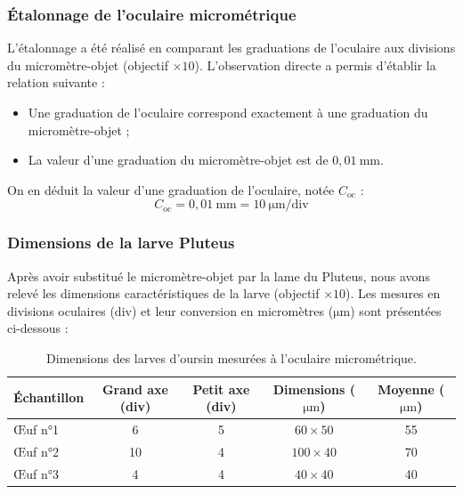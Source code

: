 \subsubsection{Étalonnage de l'oculaire micrométrique}

L'étalonnage a été réalisé en comparant les graduations de l'oculaire
aux divisions du micromètre-objet (objectif $\times 10$).
L'observation directe a permis d'établir la relation suivante :
\begin{itemize}
    \item Une graduation de l'oculaire correspond exactement à une graduation du micromètre-objet ;
    \item La valeur d'une graduation du micromètre-objet est de $0,01 \mathrm{~mm}$.
\end{itemize}

On en déduit la valeur d'une graduation de l'oculaire, notée $C_{\mathrm{oc}}$ :
\begin{equation}
    C_{\mathrm{oc}} = 0,01 \mathrm{~mm} = 10 \mathrm{~\mu m/div}
\end{equation}

\subsubsection{Dimensions de la larve Pluteus}

Après avoir substitué le micromètre-objet par la lame du Pluteus,
nous avons relevé les dimensions caractéristiques de la larve (objectif $\times 10$).
Les mesures en divisions oculaires ($\mathrm{div}$) et leur conversion en micromètres ($\mathrm{\mu m}$) 
sont présentées ci-dessous :
\begin{table}[h!]
    \centering
    \begin{tabular}{|l|c|c|c|c|}
        \hline
        \textbf{Échantillon} & \textbf{Grand axe (div)} & \textbf{Petit axe (div)} & \textbf{Dimensions ($\mathrm{\mu m}$)} & \textbf{Moyenne ($\mathrm{\mu m}$)} \\
        \hline
        Œuf n°1 & 6 & 5 & $60 \times 50$ & 55 \\
        \hline
        Œuf n°2 & 10 & 4 & $100 \times 40$ & 70 \\
        \hline
        Œuf n°3 & 4 & 4 & $40 \times 40$ & 40 \\
        \hline
    \end{tabular}
    \caption{Dimensions des larves d'oursin mesurées à l'oculaire micrométrique.}
    \label{tab:mesures_oeufs}
\end{table}